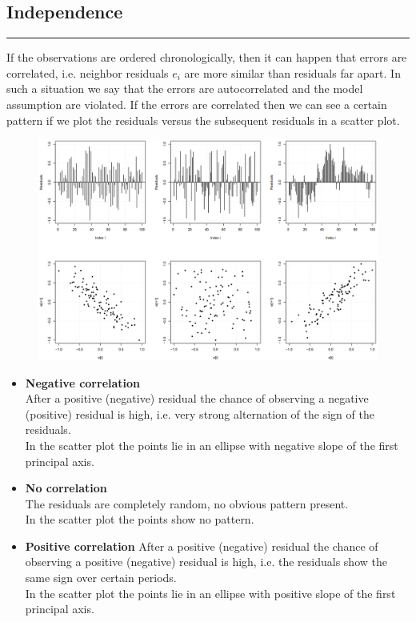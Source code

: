 \subsection{Independence}
\noindent\rule[\linienAbstand]{\linewidth}{\linienDicke}
If the observations are ordered chronologically, then it can happen that errors are correlated, i.e. neighbor residuals $e_i$ are more similar than residuals far apart. In such a situation we say that the errors are autocorrelated and the model assumption are violated. If the errors are correlated then we can see a certain pattern if we plot the residuals versus the subsequent residuals in a scatter plot.

\begin{figure}[H]
  \centering
  \includegraphics[width=\linewidth]{Pics/8.4.1.png}
\end{figure}

\begin{itemize}
  \item \textbf{Negative correlation}\\
  After a positive (negative) residual the chance of observing a negative (positive) residual is high, i.e. very strong alternation of the sign of the residuals.\\
  In the scatter plot the points lie in an ellipse with negative slope of the first principal axis.
  \item \textbf{No correlation}\\
  The residuals are completely random, no obvious pattern present.\\
  In the scatter plot the points show no pattern.
  \item \textbf{Positive correlation}
  After a positive (negative) residual the chance of observing a positive (negative) residual is high, i.e. the residuals show the same sign over certain periods.\\
  In the scatter plot the points lie in an ellipse with positive slope of the first principal axis.
\end{itemize}
